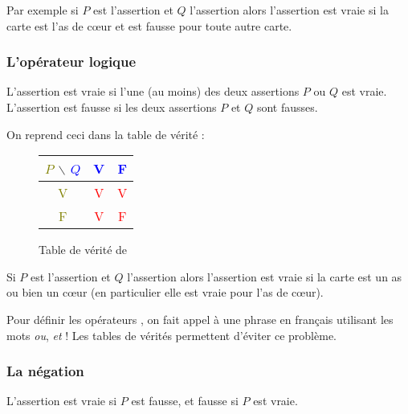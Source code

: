 \documentclass[11pt,class=report,crop=false]{standalone}
\begin{document}
Par exemple si $P$ est l'assertion  et $Q$ l'assertion
 alors l'assertion  est vraie si la carte
est l'as de c\oe ur et est fausse pour toute autre carte.



\subsubsection*{L'opérateur logique }

L'assertion  est vraie si l'une (au moins) des deux assertions $P$ ou $Q$ est vraie.
L'assertion  est fausse si les deux assertions $P$ et $Q$ sont fausses.

On reprend ceci dans la table de vérité :
\begin{figure}[H]
\centering
\begin{tabular}{c|c|c}
\textcolor{olive}{$P$} $\backslash$ \textcolor{blue}{$Q$}  & \textcolor{blue}{V} & \textcolor{blue}{F} \\ \hline
\textcolor{olive}{V} & \textcolor{red}{V} & \textcolor{red}{V} \\ \hline
\textcolor{olive}{F} & \textcolor{red}{V} & \textcolor{red}{F} \\
\end{tabular}
\caption{Table de vérité de }
\end{figure}


Si $P$ est l'assertion  et $Q$ l'assertion
 alors l'assertion  est vraie si la carte
est un as ou bien un c\oe ur (en particulier elle est vraie pour l'as de c\oe ur).


\begin{remarque*}
Pour définir les opérateurs  ,  on fait appel à une phrase en français utilisant
les mots \emph{ou}, \emph{et} ! Les tables de vérités permettent d'éviter ce problème.
\end{remarque*}



\subsubsection*{La négation }


L'assertion  est vraie si $P$ est fausse, et fausse si $P$ est vraie.
\end{document}
